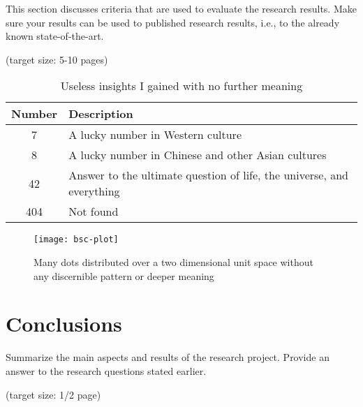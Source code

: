 \documentclass[a4paper,11pt,oneside]{article}
\begin{document}
  This section discusses criteria that are used to evaluate the
  research results. Make sure your results can be used to published
  research results, i.e., to the already known state-of-the-art.

  (target size: 5-10 pages)

  \begin{table}[ht]
    \begin{center}
      \begin{tabular}{cl}
        \toprule
        Number & Description \\
        \midrule
        7 & A lucky number in Western culture \\
        8 & A lucky number in Chinese and other Asian cultures \\
        42 & Answer to the ultimate question of life, the universe, and everything \\
        404 & Not found \\
        \bottomrule
      \end{tabular}
      \caption{Useless insights I gained with no further meaning}
    \end{center}
  \end{table}
  
  \begin{figure}[ht]
    \begin{center}
      \texttt{[image: bsc-plot]}
    \end{center}
    \caption{Many dots distributed over a two dimensional unit space
      without any discernible pattern or deeper meaning}
  \end{figure}

  \section{Conclusions}

  Summarize the main aspects and results of the research
  project. Provide an answer to the research questions stated earlier.

  (target size: 1/2 page)

  \nocite{JS06}

  \newpage
%   
%   
  \printbibliography
\end{document}
